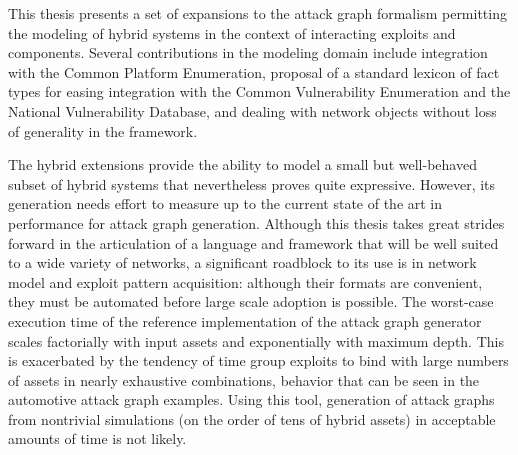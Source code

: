 This thesis presents a set of expansions to the attack graph formalism
permitting the modeling of hybrid systems in the context of interacting
exploits and components. Several contributions in the modeling domain include
integration with the Common Platform Enumeration, proposal of a standard
lexicon of fact types for easing integration with the Common Vulnerability
Enumeration and the National Vulnerability Database, and dealing with
network objects without loss of generality in the framework.

The hybrid extensions provide the ability to model a small but well-behaved
subset of hybrid systems that nevertheless proves quite expressive. However,
its generation needs effort to measure up to the current state of the art in
performance for attack graph generation.
Although this thesis takes great strides forward in the articulation of a
language and framework that will be well suited to a wide variety of networks,
a significant roadblock to its use is in network model and exploit pattern
acquisition: although their formats are convenient, they must be automated
before large scale adoption is possible.
The worst-case execution time of the reference implementation of the attack 
graph generator scales factorially with input assets and exponentially with
maximum depth. This is exacerbated by the tendency of time group exploits to
bind with large numbers of assets in nearly exhaustive combinations, behavior
that can be seen in the automotive attack graph examples. Using this tool,
generation of attack graphs from nontrivial simulations (on the order of tens
of hybrid assets) in acceptable amounts of time is not likely.


